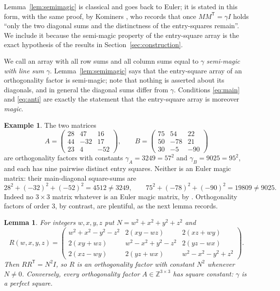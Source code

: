 \documentclass[11pt,a4paper]{amsart}
\theoremstyle{plain}
\newtheorem{lemma}[theorem]{Lemma}
\theoremstyle{definition}
\newtheorem{example}[theorem]{Example}
\theoremstyle{remark}
\newcommand{\ZZ}{\mathbb{Z}}
\newcommand{\tr}{\mathsf{T}}
\begin{document}
Lemma~\ref{lem:semimagic} is classical and goes back to Euler; it is stated in
this form, with the same proof, by Kominers \cite[\S1]{Kominers2026}, who
records that once $MM^{\tr}=\gamma I$ holds ``only the two diagonal sums and the
distinctness of the entry-squares remain''. We include it because the semi-magic
property of the entry-square array is the exact hypothesis of the results in
Section~\ref{sec:construction}.

We call an array with all row sums and all column sums equal to $\gamma$
\emph{semi-magic with line sum $\gamma$}. Lemma~\ref{lem:semimagic} says that
the entry-square array of an orthogonality factor is semi-magic; note that
nothing is asserted about its diagonals, and in general the diagonal sums differ
from $\gamma$. Conditions \eqref{eq:main} and \eqref{eq:anti} are exactly the
statement that the entry-square array is moreover \emph{magic}.

\begin{example}\label{ex:factors}
The two matrices
\[
A=\begin{pmatrix}28&47&16\\44&-32&17\\23&4&-52\end{pmatrix},
\qquad
B=\begin{pmatrix}75&54&22\\50&-78&21\\30&-5&-90\end{pmatrix}
\]
are orthogonality factors with constants $\gamma_A=3249=57^2$ and
$\gamma_B=9025=95^2$, and each has nine pairwise distinct entry squares.
Neither is an Euler magic matrix: their main-diagonal square-sums are
\[
28^2+(-32)^2+(-52)^2=4512\ne3249,\qquad
75^2+(-78)^2+(-90)^2=19809\ne9025 .
\]
Indeed no $3\times3$ matrix whatever is an Euler magic matrix, by
\cite[Theorem~1.2]{Muller2026}. Orthogonality factors of order $3$, by
contrast, are plentiful, as the next lemma records.
\end{example}

\begin{lemma}\label{lem:quaternion}
For integers $w,x,y,z$ put $N=w^2+x^2+y^2+z^2$ and
\begin{equation}\label{eq:quat}
R(w,x,y,z)=\begin{pmatrix}
w^2{+}x^2{-}y^2{-}z^2 & 2(xy-wz) & 2(xz+wy)\\
2(xy+wz) & w^2{-}x^2{+}y^2{-}z^2 & 2(yz-wx)\\
2(xz-wy) & 2(yz+wx) & w^2{-}x^2{-}y^2{+}z^2
\end{pmatrix}.
\end{equation}
Then $R R^{\tr}=N^2 I$, so $R$ is an orthogonality factor with constant $N^2$
whenever $N\ne0$. Conversely, every orthogonality factor $A\in\ZZ^{3\times3}$
has square constant: $\gamma$ is a perfect square.
\end{lemma}
\end{document}
